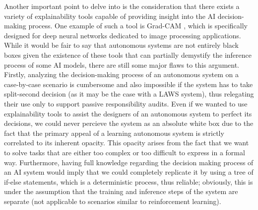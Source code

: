 Another important point to delve into is the consideration that there exists a variety of explainability tools capable of providing insight into the AI decision-making process.
One example of such a tool is Grad-CAM \parencite{RAMGCW}, which is specifically designed for deep neural networks dedicated to image processing applications.
While it would be fair to say that autonomous systems are not entirely black boxes given the existence of these tools that can partially demystify the inference process of some AI models, there are still some major flaws to this argument.
Firstly, analyzing the decision-making process of an autonomous system on a case-by-case scenario is cumbersome and also impossible if the system has to take split-second decision (as it may be the case with a LAWS system), thus relegating their use only to support passive responsibility audits.
Even if we wanted to use explainability tools to assist the designers of an autonomous system to perfect its decisions, we could never percieve the system as an absolute white box due to the fact that the primary appeal of a learning autonomous system is strictly correlated to its inherent opacity.
This opacity arises from the fact that we want to solve tasks that are either too complex or too difficult to express in a formal way.
Furthermore, having full knowledge regarding the decision making process of an AI system would imply that we could completely replicate it by using a tree of if-else statements, which is a deterministic process, thus reliable; obviously, this is under the assumption that the training and inference steps of the system are separate (not applicable to scenarios similar to reinforcement learning).